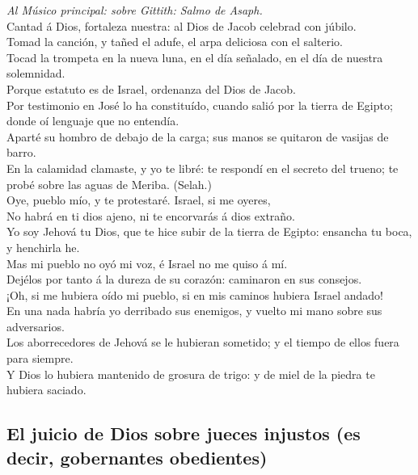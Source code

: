  \emph{Al Músico principal: sobre Gittith: Salmo de
Asaph.}\\
Cantad á Dios, fortaleza nuestra: al Dios de Jacob celebrad con
júbilo.\\
 Tomad la canción, y tañed el adufe, el arpa deliciosa con
el salterio.\\
 Tocad la trompeta en la nueva luna, en el día señalado, en
el día de nuestra solemnidad.\\
 Porque estatuto es de Israel, ordenanza del Dios de
Jacob.\\
 Por testimonio en José lo ha constituído, cuando salió por
la tierra de Egipto; donde oí lenguaje que no entendía.\\
 Aparté su hombro de debajo de la carga; sus manos se
quitaron de vasijas de barro.\\
 En la calamidad clamaste, y yo te libré: te respondí en el
secreto del trueno; te probé sobre las aguas de Meriba. (Selah.)\\
 Oye, pueblo mío, y te protestaré. Israel, si me oyeres,\\
 No habrá en ti dios ajeno, ni te encorvarás á dios
extraño.\\
 Yo soy Jehová tu Dios, que te hice subir de la tierra de
Egipto: ensancha tu boca, y henchirla he.\\
 Mas mi pueblo no oyó mi voz, é Israel no me quiso á mí.\\
 Dejélos por tanto á la dureza de su corazón: caminaron en
sus consejos.\\
 ¡Oh, si me hubiera oído mi pueblo, si en mis caminos
hubiera Israel andado!\\
 En una nada habría yo derribado sus enemigos, y vuelto mi
mano sobre sus adversarios.\\
 Los aborrecedores de Jehová se le hubieran sometido; y el
tiempo de ellos fuera para siempre.\\
 Y Dios lo hubiera mantenido de grosura de trigo: y de miel
de la piedra te hubiera saciado.

\hypertarget{el-juicio-de-dios-sobre-jueces-injustos-es-decir-gobernantes-obedientes}{%
\subsection{El juicio de Dios sobre jueces injustos (es decir,
gobernantes
obedientes)}\label{el-juicio-de-dios-sobre-jueces-injustos-es-decir-gobernantes-obedientes}}

